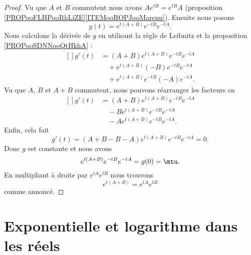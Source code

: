 \begin{proof}
    Vu que \( A\) et \( B\) commutent nous avons \( A e^{tB}= e^{tB}A\) (proposition \ref{PROPooFLHPooRhLiZE}\ref{ITEMooROPJooMarenu}). Ensuite nous posons
    \begin{equation}
        g(t)= e^{t(A+B)} e^{-tB} e^{-tA}.
    \end{equation}
    Nous calculons la dérivée de \( g\) en utilisant la règle de Leibnitz et la proposition \ref{PROPooSDNNooQtHkhA} :
    \begin{equation}
        \begin{aligned}[]
            g'(t)&=(A+B) e^{t(A+B)} e^{-tB} e^{-tA}\\
            &\quad + e^{t(A+B)}(-B) e^{-tB} e^{-tA}\\
            &\quad +  e^{t(A+B)} e^{-tB}(-A) e^{-tA}.
        \end{aligned}
    \end{equation}
    Vu que \( A\), \( B\) et \( A+B \) commutent, nous pouvons réarranger les facteurs en
    \begin{equation}
        \begin{aligned}[]
            g'(t)&=(A+B) e^{t(A+B)} e^{-tB} e^{-tA}\\
            &\quad -B e^{t(A+B)} e^{-tB} e^{-tA}\\
            &\quad -A  e^{t(A+B)} e^{-tB} e^{-tA}.
        \end{aligned}
    \end{equation}
    Enfin, cela fait
    \begin{equation}
        g'(t)=(A+B-B-A) e^{t(A+B)} e^{-tB} e^{-tA}=0.
    \end{equation}
    Donc \( g\) est constante et nous avons
    \begin{equation}
        e^{t(A+B)} e^{-tB} e^{-tA}=g(0)=\mtu.
    \end{equation}
    En multipliant à droite par \(  e^{tA} e^{tB}\) nous trouvons
    \begin{equation}
        e^{t(A+B)}= e^{tA} e^{tB}
    \end{equation}
    comme annoncé.
\end{proof}

\section{Exponentielle et logarithme dans les réels}

